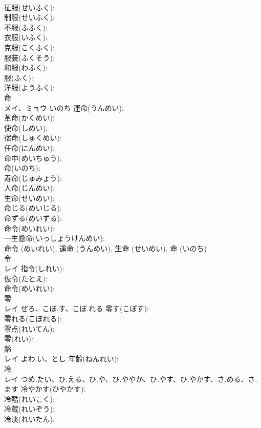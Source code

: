 \documentclass[8pt]{extreport}
\begin{document}
\begin{CJK}{UTF8}{min}
\\	征服(せいふく): 
\\	制服(せいふく): 
\\	不服(ふふく): 
\\	衣服(いふく): 
\\	克服(こくふく): 
\\	服装(ふくそう): 
\\	和服(わふく): 
\\	服(ふく): 
\\	洋服(ようふく): 
\\	命			
\\	メイ、ミョウ	いのち	運命(うんめい): 
\\	革命(かくめい): 
\\	使命(しめい): 
\\	宿命(しゅくめい): 
\\	任命(にんめい): 
\\	命中(めいちゅう): 
\\	命(いのち): 
\\	寿命(じゅみょう): 
\\	人命(じんめい): 
\\	生命(せいめい): 
\\	命じる(めいじる): 
\\	命ずる(めいずる): 
\\	命令(めいれい): 
\\	一生懸命(いっしょうけんめい): 
\\	命令 (めいれい), 運命 (うんめい), 生命 (せいめい), 命 (いのち)
\\	令			
\\	レイ		指令(しれい): 
\\	仮令(たとえ): 
\\	命令(めいれい): 
\\	零			
\\	レイ	ぜろ、こぼ.す、こぼ.れる	零す(こぼす): 
\\	零れる(こぼれる): 
\\	零点(れいてん): 
\\	零(れい): 
\\	齢			
\\	レイ	よわ.い、とし	年齢(ねんれい): 
\\	冷			
\\	レイ	つめ.たい、ひ.える、ひ.や、ひ.ややか、ひ.やす、ひ.やかす、さ.める、さ.ます	冷やかす(ひやかす): 
\\	冷酷(れいこく): 
\\	冷蔵(れいぞう): 
\\	冷淡(れいたん): 

\end{CJK}
\end{document}

